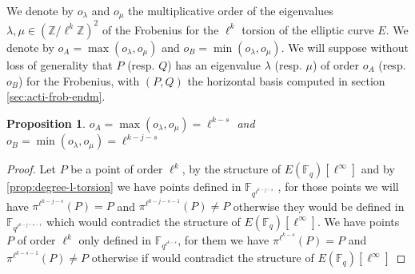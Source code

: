 \documentclass{lms}
\newcommand{\todo}[1]{{\color{red}TODO: #1}}
\newtheorem{prop}[thm]{Proposition}
\begin{document}
\begin{defi}
We denote by $o_{\lambda}$ and $o_{\mu}$ the multiplicative order of the
eigenvalues $\lambda , \mu \in (\mathbb{Z}/\ell^k\mathbb{Z})^2$ of the Frobenius for the
$\ell^{k}$ torsion of the elliptic curve $E$.
\newline
We denote by $o_A=\max(o_{\lambda},o_{\mu})$ and $o_B=\min(o_{\lambda},o_{\mu})$.
We will suppose without loss of generality that $P$ (resp. $Q$) has an eigenvalue $\lambda$ (resp. $\mu$) of order $o_A$ (resp. $o_B$) for the Frobenius, with $(P,Q)$ the horizontal basis computed in section \ref{sec:acti-frob-endm}.
\end{defi}

\begin{prop}
$o_A=\max(o_{\lambda},o_{\mu}) = \ell^{k-s}$ and $o_B=\min(o_{\lambda},o_{\mu}) = \ell^{k-j-s}$
\end{prop}

\begin{proof}

 Let $P$ be a point of order $\ell^k$, by the structure of $E(\mathbb{F}_q)[\ell^{\infty}]$ and by \ref{prop:degree-l-torsion} we have points defined in $\mathbb{F}_{q^{\ell^{k-j-s}}}$ , for those points we will have $\pi^{\ell^{k-j-s}}(P)=P$ and $\pi^{\ell^{k-j-s-1}}(P) \neq P$ otherwise they would be defined in $\mathbb{F}_{q^{\ell^{k-j-s-1}}}$ which would contradict the structure of $E(\mathbb{F}_q)[\ell^{\infty}]$. We have points $P$ of order $\ell^k$ only defined in $\mathbb{F}_{q^{\ell^{k-s}}}$, for them we have $\pi^{\ell^{k-s}}(P)=P$ and $\pi^{\ell^{k-s-1}}(P) \neq P$ otherwise if would contradict the structure of $E(\mathbb{F}_q)[\ell^{\infty}]$
\end{proof}
\end{document}
